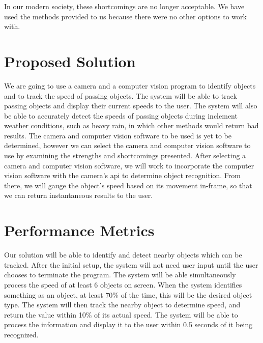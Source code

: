 \documentclass[letterpaper,10pt,onecolumn,draftclsnofoot]{IEEEtran}
\begin{document}
 In our modern society, these shortcomings are no longer acceptable.
 We have used the methods provided to us because there were no other options to work with.



\section{Proposed Solution}

We are going to use a camera and a computer vision program to identify objects and to track the speed of passing objects.
 The system will be able to track passing objects and display their current speeds to the user.
 The system will also be able to accurately detect the speeds of passing objects during inclement weather conditions, such as heavy rain, in which other methods would return bad results.
 The camera and computer vision software to be used is yet to be determined, however we can select the camera and computer vision software to use by examining the strengths and shortcomings presented.
 After selecting a camera and computer vision software, we will work to incorporate the computer vision software with the camera’s api to determine object recognition.
 From there, we will gauge the object’s speed based on its movement in-frame, so that we can return instantaneous results to the user.
 

\section{Performance Metrics}

Our solution will be able to identify and detect nearby objects which can be tracked.
After the initial setup, the system will not need user input until the user chooses to terminate the program.
The system will be able simultaneously process the speed of at least 6 objects on screen. 
When the system identifies something as an object, at least 70\% of the time, this will be the desired object type.
The system will then track the nearby object to determine speed, and return the value within 10\% of its actual speed.
The system will be able to process the information and display it to the user within 0.5 seconds of it being recognized.
\end{document}
